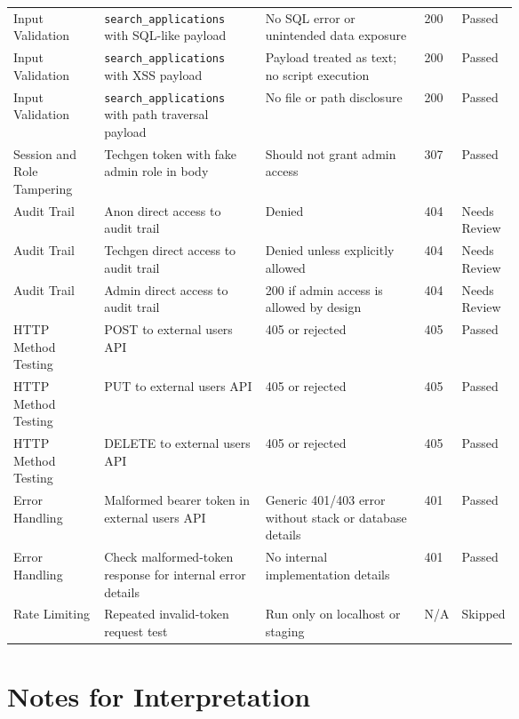 \begin{landscape}
\begin{xltabular}{\linewidth}{p{0.18\linewidth} p{0.32\linewidth} X p{0.07\linewidth} p{0.09\linewidth}}
Input Validation & \texttt{search\_applications} with SQL-like payload & No SQL error or unintended data exposure & 200 & Passed \\
Input Validation & \texttt{search\_applications} with XSS payload & Payload treated as text; no script execution & 200 & Passed \\
Input Validation & \texttt{search\_applications} with path traversal payload & No file or path disclosure & 200 & Passed \\

Session and Role Tampering & Techgen token with fake admin role in body & Should not grant admin access & 307 & Passed \\

Audit Trail & Anon direct access to audit trail & Denied & 404 & Needs Review \\
Audit Trail & Techgen direct access to audit trail & Denied unless explicitly allowed & 404 & Needs Review \\
Audit Trail & Admin direct access to audit trail & 200 if admin access is allowed by design & 404 & Needs Review \\

HTTP Method Testing & POST to external users API & 405 or rejected & 405 & Passed \\
HTTP Method Testing & PUT to external users API & 405 or rejected & 405 & Passed \\
HTTP Method Testing & DELETE to external users API & 405 or rejected & 405 & Passed \\

Error Handling & Malformed bearer token in external users API & Generic 401/403 error without stack or database details & 401 & Passed \\
Error Handling & Check malformed-token response for internal error details & No internal implementation details & 401 & Passed \\

Rate Limiting & Repeated invalid-token request test & Run only on localhost or staging & N/A & Skipped \\

\hline
\end{xltabular}

\normalsize
\end{landscape}

\section*{Notes for Interpretation}

